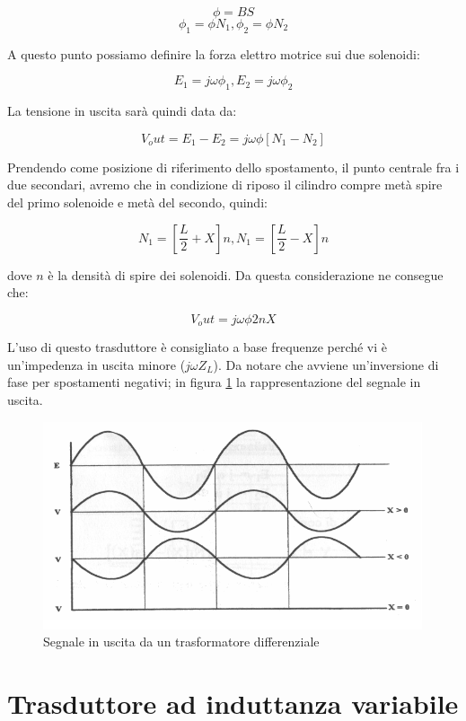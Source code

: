 	\[\phi=BS\]
	\[\phi_1=\phi N_1, \phi_2=\phi N_2 \]

A questo punto possiamo definire la forza elettro motrice sui due
solenoidi:

	\[E_1=j\omega\phi_1, E_2=j\omega\phi_2 \]

La tensione in uscita sarà quindi data da:

	\[V_out = E_1 - E_2 = j\omega\phi[N_1 - N_2]\]

Prendendo come posizione di riferimento dello spostamento, il punto
centrale fra i due secondari, avremo che in condizione di riposo il
cilindro compre metà spire del primo solenoide e metà del secondo,
quindi:

	\[N_1 = [\frac{L}{2}+X]n, N_1 = [\frac{L}{2}-X]n\]

dove $n$ è la densità di spire dei solenoidi. Da questa
considerazione ne consegue che:

	\[V_out=j\omega\phi 2nX\]

L'uso di questo trasduttore è consigliato a base frequenze perché vi
è un'impedenza in uscita minore ($j\omega Z_L$).
Da notare che avviene un'inversione di fase per spostamenti negativi;
in figura \ref{fig:trasdifffase} la rappresentazione del segnale in
uscita.

\begin{figure}[htbp]
	\centering
	\includegraphics[scale=0.5]
{img/trasformatore-differenziale-fase.png}
	\caption{Segnale in uscita da un trasformatore
differenziale\label{fig:trasdifffase}}
\end{figure}

\section{Trasduttore ad induttanza variabile}
